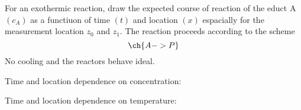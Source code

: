 \begin{question}
For an exothermic reaction, draw the expected course of reaction of the educt A $(c_A)$ as a functiuon of time $(t)$ and location $(x)$ espacially for the measurement location $z_0$ and $z_1$. The reaction proceeds according to the scheme
\begin{equation*}
\ch{A -> P}
\end{equation*}
No cooling and the reactors behave ideal.
\end{question}
\begin{solution}
Time and location dependence on concentration:
\begin{center}

\end{center}
Time and location dependence on temperature:
\begin{center}

\end{center}
\end{solution}
